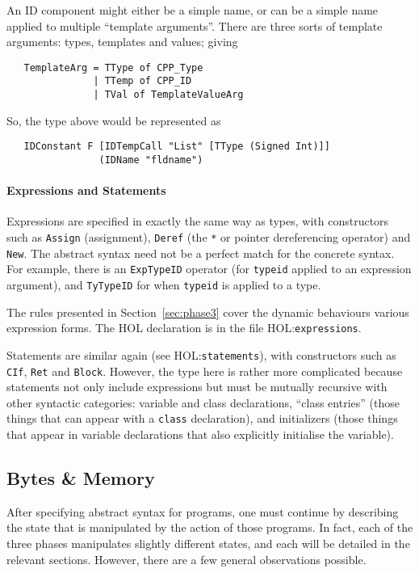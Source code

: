 \documentclass[11pt]{article}
\newcommand{\HOLfile}[1]{HOL:\texttt{#1}}
\begin{document}
An ID component might either be a simple name, or can be a simple name
applied to multiple ``template arguments''.  There are three sorts of
template arguments: types, templates and values; giving
\begin{verbatim}
   TemplateArg = TType of CPP_Type
               | TTemp of CPP_ID
               | TVal of TemplateValueArg
\end{verbatim}
So, the type above would be represented as
\begin{verbatim}
   IDConstant F [IDTempCall "List" [TType (Signed Int)]]
                (IDName "fldname")
\end{verbatim}


\paragraph{Expressions and Statements}

Expressions are specified in exactly the same way as types, with
constructors such as \texttt{Assign} (assignment), \texttt{Deref} (the
\texttt{*} or pointer dereferencing operator) and \texttt{New}.  The
abstract syntax need not be a perfect match for the concrete syntax.
For example, there is an \texttt{ExpTypeID} operator (for
\texttt{typeid} applied to an expression argument), and
\texttt{TyTypeID} for when \texttt{typeid} is applied to a type.

The rules presented in Section~\ref{sec:phase3} cover the dynamic
behaviours various expression forms.  The HOL declaration is in the
file \HOLfile{expressions}.

Statements are similar again (see \HOLfile{statements}), with
constructors such as \texttt{CIf}, \texttt{Ret} and \texttt{Block}.
However, the type here is rather more complicated because statements
not only include expressions but must be mutually recursive with other
syntactic categories: variable and class declarations, ``class
entries'' (those things that can appear with a \texttt{class}
declaration), and initializers (those things that appear in variable
declarations that also explicitly initialise the variable).

\subsection{Bytes \& Memory}
\label{sec:bytes-memory-states}

After specifying abstract syntax for programs, one must continue by
describing the state that is manipulated by the action of those
programs.   In fact, each of the three phases manipulates slightly
different states, and each will be detailed in the relevant sections.
However, there are a few general observations possible.
\end{document}
